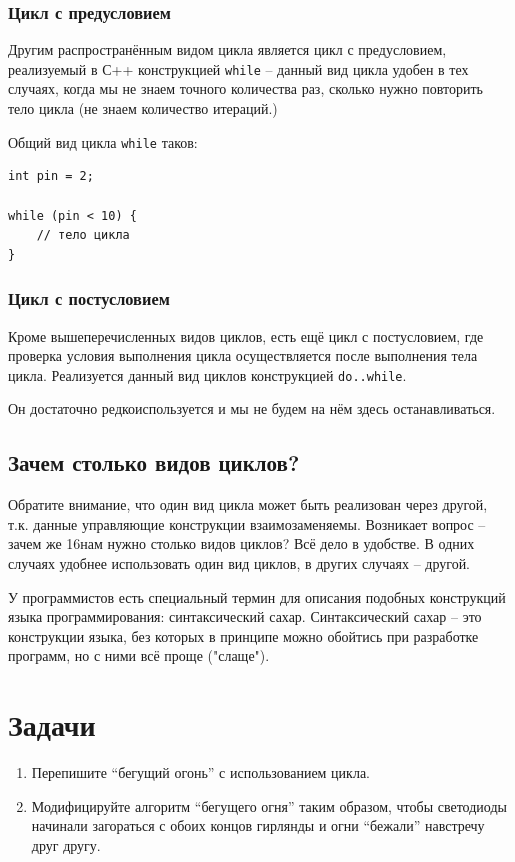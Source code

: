 \documentclass[a4paper,twoside]{book}
\begin{document}
\subsubsection{Цикл с предусловием}

Другим распространённым видом цикла является цикл с предусловием, реализуемый в
С++ конструкцией \texttt{while} -- данный вид цикла удобен в тех случаях, когда
мы не знаем точного количества раз, сколько нужно повторить тело цикла (не знаем
количество итераций.)

Общий вид цикла \texttt{while} таков:
\begin{verbatim}
int pin = 2;

while (pin < 10) {
    // тело цикла
}
\end{verbatim}

\subsubsection{Цикл с постусловием}

Кроме вышеперечисленных видов циклов, есть ещё цикл с постусловием, где
проверка условия выполнения цикла осуществляется после выполнения тела цикла.
Реализуется данный вид циклов конструкцией \texttt{do..while}.

Он достаточно редкоиспользуется и мы не будем на нём здесь останавливаться.

\subsection{Зачем столько видов циклов?}

Обратите внимание, что один вид цикла может быть реализован через другой, т.к.
данные управляющие конструкции взаимозаменяемы. Возникает вопрос -- зачем же
16нам нужно столько видов циклов? Всё дело в удобстве. В одних случаях удобнее
использовать один вид циклов, в других случаях -- другой.

У программистов есть специальный термин для описания подобных конструкций языка
программирования: синтаксический сахар. Синтаксический сахар -- это конструкции
языка, без которых в принципе можно обойтись при разработке программ, но с ними
всё проще ("слаще").

\section{Задачи}
\begin{enumerate}
\item Перепишите ``бегущий огонь'' с использованием цикла.
\item Модифицируйте алгоритм ``бегущего огня'' таким образом, чтобы светодиоды
  начинали загораться с обоих концов гирлянды и огни ``бежали'' навстречу друг
  другу.
\end{enumerate}
\end{document}
